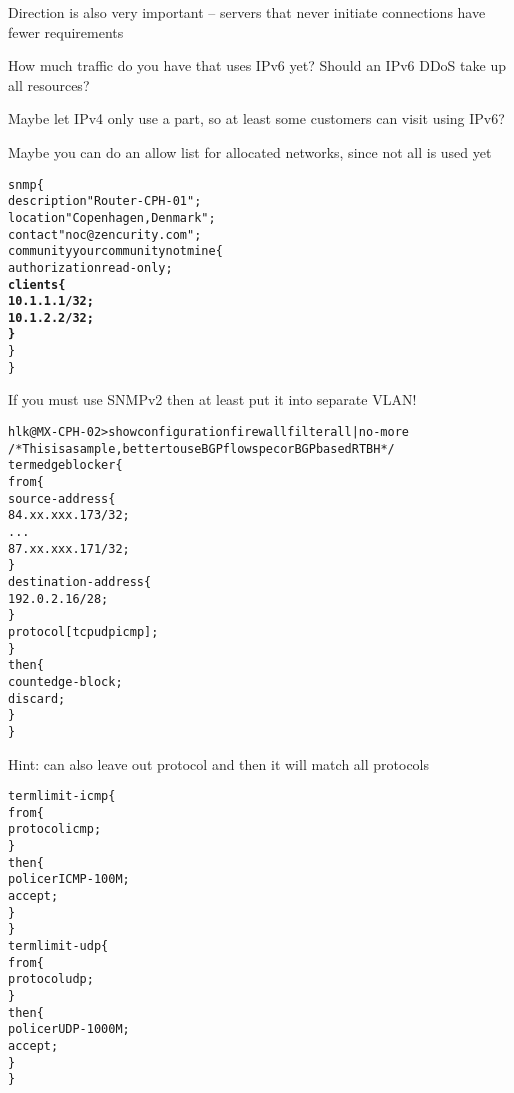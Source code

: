 \documentclass[Screen16to9,17pt]{foils}
\begin{document}
\begin{list2}
\item Direction is also very important -- servers that never initiate connections have fewer requirements
\item How much traffic do you have that uses IPv6 yet? Should an IPv6 DDoS take up all resources?
\item Maybe let IPv4 only use a part, so at least some customers can visit using IPv6?
\item Maybe you can do an allow list for allocated networks, since not all is used yet
\end{list2}




\begin{alltt}\footnotesize
snmp \{
    description "Router-CPH-01";
    location "Copenhagen, Denmark";
    contact "noc@zencurity.com";
    community yourcommunitynotmine \{
        authorization read-only;
        {\bf clients \{
               10.1.1.1/32;
               10.1.2.2/32;
        \}    }
    \}
\}
\end{alltt}

If you must use SNMPv2 then at least put it into separate VLAN! {\myalert}




\begin{alltt}\footnotesize
hlk@MX-CPH-02> show configuration firewall filter all | no-more
/* This is a sample, better to use BGP flowspec or BGP based RTBH */
term edgeblocker \{
    from \{
        source-address \{
            84.xx.xxx.173/32;
...
            87.xx.xxx.171/32;
        \}
        destination-address \{
            192.0.2.16/28;
        \}
        protocol [ tcp udp icmp ];
    \}
    then \{
        count edge-block;
        discard;
    \}
\}
\end{alltt}
Hint: can also leave out protocol and then it will match all protocols


\begin{alltt}\footnotesize
term limit-icmp \{
    from \{
        protocol icmp;
    \}
    then \{
        policer ICMP-100M;
        accept;
    \}
\}
term limit-udp \{
    from \{
        protocol udp;
    \}
    then \{
        policer UDP-1000M;
        accept;
    \}
\}
\end{alltt}
\end{document}
